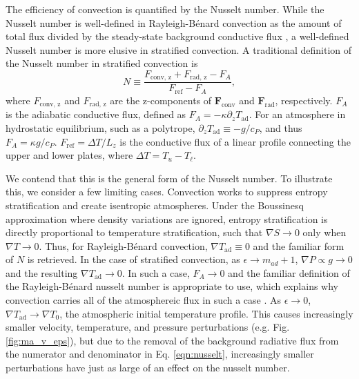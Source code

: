 \documentclass[aps, prl, twocolumn, groupedaddress, amsfonts, amssymb, amsmath]{revtex4-1}
\newcommand{\grad}{\ensuremath{\nabla}}
\newcommand{\RB}{Rayleigh-B\'{e}nard }
\begin{document}
The efficiency of convection is quantified by the Nusselt number.  
While the Nusselt number is well-defined in \RB convection
as the amount of total flux divided by the steady-state background conductive flux 
\cite{johnston&doering2009, otero&all2002},
a well-defined Nusselt number is more elusive in stratified convection.  A traditional definition of the Nusselt
number in stratified convection is \cite{graham1975,hurlburt&all1984}
\begin{equation}
N \equiv \frac{F_{\text{conv, z}} + F_{\text{rad, z}} - F_A}{F_{\text{ref}} - F_A},
\label{eqn:nusselt}
\end{equation}
where $F_{\text{conv, z}}$ and $F_{\text{rad, z}}$ are the z-components of $\bm{F}_{\text{conv}}$ and $\bm{F}_{\text{rad}}$,
respectively.  $F_A$ is the adiabatic conductive flux, defined as $F_A = -\kappa \partial_z T_{\text{ad}}$.  For an
atmosphere in hydrostatic equilibrium, such as a polytrope, $\partial_z T_{\text{ad}} \equiv - g / c_{P}$, and thus
$F_A = \kappa g / c_{P}$.  $F_{\text{ref}} = \Delta T / L_z$ is the conductive flux of a linear profile connecting the upper
and lower plates, where $\Delta T = T_{u} - T_{\ell}$.  

We contend that this is the general form of the Nusselt number.  To illustrate this, we consider a few limiting
cases. Convection works to
suppress entropy stratification and create isentropic atmospheres.  Under the Boussinesq approximation where
density variations are ignored, entropy stratification is directly proportional to temperature stratification,
such that $\grad S \rightarrow 0$ only when $\grad T \rightarrow 0$.  Thus, for \RB convection, 
$\grad T_{\text{ad}} \equiv 0$ and the familiar form of $N$ is retrieved.  In the case of stratified convection,
as $\epsilon \rightarrow m_{ad} + 1$, $\grad P \propto g \rightarrow 0$ and
the resulting $\grad T_{\text{ad}} \rightarrow 0$.  In such a case, $F_A \rightarrow 0$ and the familiar
definition of the \RB nusselt number is appropriate to use, which explains why convection carries all of the
atmosphereic flux in such a case \cite{brandenburg&all2005}. As $\epsilon \rightarrow 0$, 
$\grad T_{\text{ad}}\rightarrow \grad T_0$, the atmospheric initial temperature profile.  This causes increasingly
smaller velocity, temperature, and pressure perturbations (e.g. Fig. \ref{fig:ma_v_eps}), but due to the removal
of the background radiative flux from the numerator and denominator in Eq. \ref{eqn:nusselt}, increasingly smaller
perturbations have just as large of an effect on the nusselt number.
\end{document}
